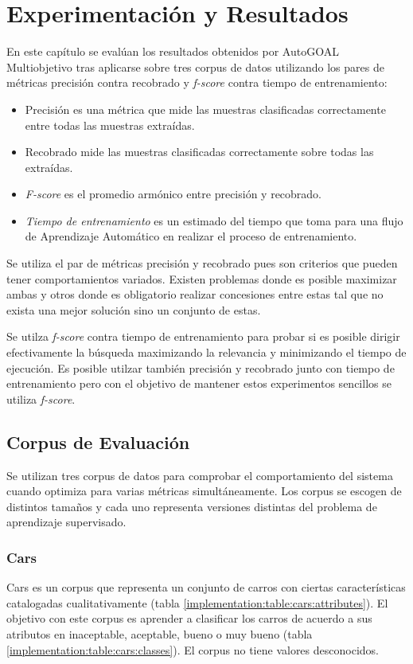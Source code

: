 \chapter{Experimentaci\'on y Resultados}\label{chapter:experiments}
En este cap\'itulo se eval\'uan los resultados obtenidos por AutoGOAL Multiobjetivo tras aplicarse sobre tres corpus de datos utilizando los pares de m\'etricas precisi\'on contra recobrado y \textit{f-score} contra tiempo de entrenamiento:
\begin{itemize}
    \item Precisi\'on es una m\'etrica que mide las muestras clasificadas correctamente entre todas las muestras extra\'idas.
    \item Recobrado mide las muestras clasificadas correctamente sobre todas las extra\'idas.
    \item \textit{F-score} es el promedio arm\'onico entre precisi\'on y recobrado.
    \item \textit{Tiempo de entrenamiento} es un estimado del tiempo que toma para una flujo de Aprendizaje Autom\'atico en realizar el proceso de entrenamiento.
\end{itemize}

Se utiliza el par de m\'etricas precisi\'on y recobrado pues son criterios que pueden tener comportamientos variados. Existen problemas donde es posible maximizar ambas y otros donde es obligatorio realizar concesiones entre estas tal que no exista una mejor soluci\'on sino un conjunto de estas.

Se utilza \textit{f-score} contra tiempo de entrenamiento para probar si es posible dirigir efectivamente  la b\'usqueda maximizando la relevancia y minimizando el tiempo de ejecuci\'on. Es posible utilzar tambi\'en precisi\'on y recobrado junto con tiempo de entrenamiento pero con el objetivo de mantener estos experimentos sencillos se utiliza \textit{f-score}.

\section{Corpus de Evaluaci\'on}
Se utilizan tres corpus de datos para comprobar el comportamiento del sistema cuando optimiza para varias m\'etricas simult\'aneamente. Los corpus se escogen de distintos tamaños y cada uno representa versiones distintas del problema de aprendizaje supervisado.

\subsection{Cars}
Cars  es un corpus que representa un conjunto de carros con ciertas caracter\'isticas catalogadas cualitativamente (tabla \ref{implementation:table:cars:attributes}). El objetivo con este corpus es aprender a clasificar los carros de  acuerdo a sus atributos  en inaceptable, aceptable, bueno o muy bueno (tabla \ref{implementation:table:cars:classes}). El corpus no tiene valores desconocidos.

